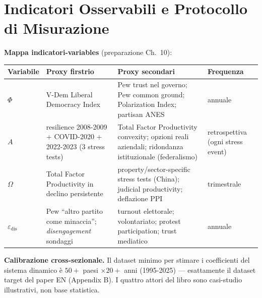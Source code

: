 \section{Indicatori Osservabili e Protocollo di
Misurazione}\label{indicatori-osservabili-e-protocollo-di-measurement}

\Proved{} \textbf{Mappa indicatori-variables} (preparazione Ch.~10):

{\def\LTcaptype{none} %
{\small\begin{longtable}[]{@{}
  >{\raggedright\arraybackslash}p{}
  >{\raggedright\arraybackslash}p{}
  >{\raggedright\arraybackslash}p{}
  >{\raggedright\arraybackslash}p{}@{}}
\toprule\noalign{}
\begin{minipage}[b]{\linewidth}\raggedright
Variabile
\end{minipage} & \begin{minipage}[b]{\linewidth}\raggedright
Proxy firstrio
\end{minipage} & \begin{minipage}[b]{\linewidth}\raggedright
Proxy secondari
\end{minipage} & \begin{minipage}[b]{\linewidth}\raggedright
Frequenza
\end{minipage} \\
\midrule\noalign{}
\endhead
\bottomrule\noalign{}
\endlastfoot
\(\Phi\) & V-Dem Liberal Democracy Index & Pew trust nel governo; Pew
common ground; Polarization Index; partisan ANES & annuale \\
\(A\) & resilience 2008-2009 + COVID-2020 + 2022-2023 (3 stress tests) &
Total Factor Productivity convexity; opzioni reali aziendali; ridondanza
istituzionale (federalismo) & retrospettiva (ogni stress event) \\
\(\Omega\) & Total Factor Productivity in declino persistente &
property/sector-specific stress tests (China); judicial productivity;
deflazione PPI & trimestrale \\
\(\varepsilon_{\text{dis}}\) & Pew ``altro partito come minaccia'';
\emph{disengagement} sondaggi & turnout elettorale; volontariato;
protest participation; trust mediatico & annuale \\
\end{longtable}}
}

\Hypoth{} \textbf{Calibrazione cross-sezionale.} Il dataset minimo per
stimare i coefficienti del sistema dinamico è \(50+\) paesi
\(\times 20+\) anni (1995-2025) --- esattamente il dataset target del
paper EN (Appendix B). I quattro attori del libro sono casi-studio
illustrativi, non base statistica.

